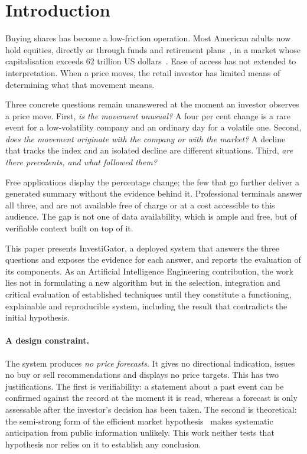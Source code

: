 \documentclass[runningheads]{llncs}
\begin{document}
\section{Introduction}

Buying shares has become a low-friction operation. Most American adults now hold equities,
directly or through funds and retirement plans~\cite{gallup2025stock}, in a market whose
capitalisation exceeds 62 trillion US dollars~\cite{sifma2025factbook}. Ease of access has
not extended to interpretation. When a price moves, the retail investor has limited means
of determining what that movement means.

Three concrete questions remain unanswered at the moment an investor observes a price
move. First, \emph{is the movement unusual?} A four per cent change is a rare event for a
low-volatility company and an ordinary day for a volatile one. Second, \emph{does the
movement originate with the company or with the market?} A decline that tracks the index
and an isolated decline are different situations. Third, \emph{are there precedents, and
what followed them?}

Free applications display the percentage change; the few that go further deliver a
generated summary without the evidence behind it. Professional terminals answer all three,
and are not available free of charge or at a cost accessible to this audience. The gap is not one of data
availability, which is ample and free, but of verifiable context built on top of it.

This paper presents InvestiGator, a deployed system that answers the three questions and
exposes the evidence for each answer, and reports the evaluation of its components. As an
Artificial Intelligence Engineering contribution, the work lies not in formulating a new
algorithm but in the selection, integration and critical evaluation of established
techniques until they constitute a functioning, explainable and reproducible system,
including the result that contradicts the initial hypothesis.

\paragraph{A design constraint.} The system produces \emph{no price forecasts}. It gives no
directional indication, issues no buy or sell recommendations and displays no price
targets. This has two justifications. The first is verifiability: a statement about a past
event can be confirmed against the record at the moment it is read, whereas a forecast is
only assessable after the investor's decision has been taken. The second is theoretical:
the semi-strong form of the efficient market hypothesis~\cite{fama1970efficient} makes
systematic anticipation from public information unlikely. This work neither tests that
hypothesis nor relies on it to establish any conclusion.
\end{document}
